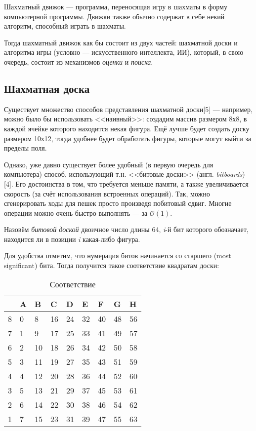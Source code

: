 {	Шахматный движок --- программа, переносящая игру в шахматы в форму компьютерной программы. Движки также обычно содержат в себе некий алгоритм, способный играть в шахматы.
	
	Тогда шахматный движок как бы состоит из двух частей: шахматной доски и алгоритма игры (условно --- искусственного интеллекта, ИИ), который, в свою очередь, состоит из механизмов \textit{оценки} и \textit{поиска}.
	
	\subsection{Шахматная доска}
	
	Существует множество способов представления шахматной доски[5] --- например, можно было бы использовать <<наивный>>: создадим массив размером 8х8, в каждой ячейке которого находится некая фигура. Ещё лучше будет создать доску размером 10х12, тогда удобнее будет обработать фигуры, которые могут выйти за пределы поля.
	
	Однако, уже давно существует более удобный (в первую очередь для компьютера) способ, использующий т.н. <<битовые доски>> (англ. \textit{bitboards})[4]. Его достоинства в том, что требуется меньше памяти, а также увеличивается скорость (за счёт использования встроенных операций). Так, можно сгенерировать ходы для пешек просто произведя побитовый сдвиг. Многие операции можно очень быстро выполнять --- за $\mathcal{O}(1)$.
	
	Назовём \textit{битовой доской} двоичное число длины 64, \textit{i}-й бит которого обозначает, находится ли в позиции \textit{i} какая-либо фигура.
	
	Для удобства отметим, что нумерация битов начинается со старшего (most significant) бита. Тогда получится такое соответствие квадратам доски:
	
	
	
	\begin{table}[h]
		\centering
		\caption{Соответствие}
		\label{tab: accord}
		\begin{tabular}{|l|l|l|l|l|l|l|l|l|}
			\hline
			  & A & B  & C  & D  & E  & F  & G  & H  \\ \hline
			8 & 0 & 8  & 16 & 24 & 32 & 40 & 48 & 56 \\ \hline
			7 & 1 & 9  & 17 & 25 & 33 & 41 & 49 & 57 \\ \hline
			6 & 2 & 10 & 18 & 26 & 34 & 42 & 50 & 58 \\ \hline
			5 & 3 & 11 & 19 & 27 & 35 & 43 & 51 & 59 \\ \hline
			4 & 4 & 12 & 20 & 28 & 36 & 44 & 52 & 60 \\ \hline
			3 & 5 & 13 & 21 & 29 & 37 & 45 & 53 & 61 \\ \hline
			2 & 6 & 14 & 22 & 30 & 38 & 46 & 54 & 62 \\ \hline
			1 & 7 & 15 & 23 & 31 & 39 & 47 & 55 & 63 \\ \hline
		\end{tabular}
	\end{table}
	
}
